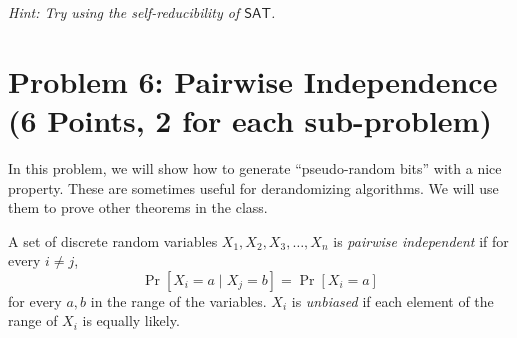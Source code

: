 \documentclass{article}
\begin{document}
\emph{Hint: Try using the self-reducibility of $\mathsf{SAT}$.}

\newpage
\section*{Problem 6: Pairwise Independence (6 Points, 2 for each sub-problem)}  

In this problem, we will show how to generate ``pseudo-random bits'' with a nice property. These are sometimes useful for derandomizing algorithms. We will use them to prove other theorems in the class.

A set of discrete random variables $X_1, X_2, X_3, \ldots, X_n$ is {\em pairwise independent} if for every $i \neq j$,
\[\Pr[ X_i = a \mid X_j = b ] = \Pr[ X_i = a]\] for every $a,b$ in the range of the variables.
$X_i$ is {\em unbiased} if each element of the range of $X_i$ is equally likely.
\end{document}
